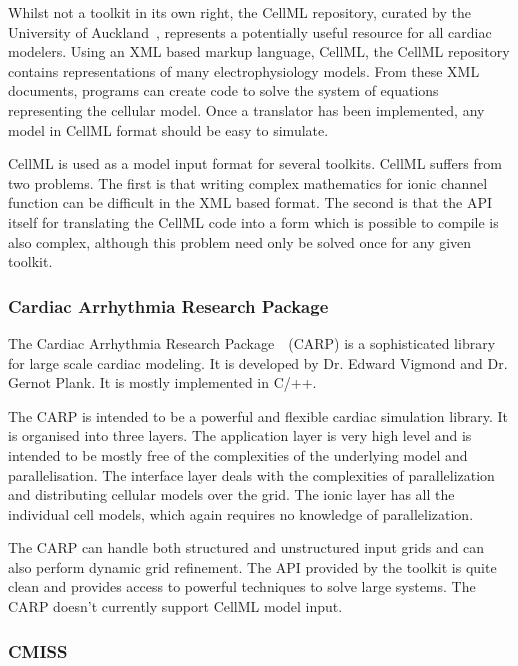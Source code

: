 Whilst not a toolkit in its own right, the CellML repository, curated by the
University of Auckland~\cite{Lloyd2008}, represents a potentially useful
resource for all cardiac modelers.
Using an XML based markup language, CellML, the CellML repository contains
representations of many electrophysiology models.
From these XML documents, programs can create code to solve the system of
equations representing the cellular model.
Once a translator has been implemented, any model in CellML format should be
easy to simulate.

CellML is used as a model input format for several toolkits.
CellML suffers from two problems.
The first is that writing complex mathematics for ionic channel function can be
difficult in the XML based format.
The second is that the API itself for translating the CellML code into a form
which is possible to compile is also complex, although this problem need only be
solved once for any given toolkit.


\subsubsection{Cardiac Arrhythmia Research Package}

The Cardiac Arrhythmia Research Package~\cite{Vigmond2003,Bauer2007,Plank2005,Vigmond2007}\
(CARP) is a sophisticated library for large scale cardiac modeling.
It is developed by Dr. Edward Vigmond and Dr. Gernot Plank.
It is mostly implemented in C/++.

The CARP is intended to be a powerful and flexible cardiac simulation library.
It is organised into three layers.
The application layer is very high level and is intended to be mostly free of
the complexities of the underlying model and parallelisation.
The interface layer deals with the complexities of parallelization and
distributing cellular models over the grid.
The ionic layer has all the individual cell models, which again requires no
knowledge of parallelization.

The CARP can handle both structured and unstructured input grids and can also
perform dynamic grid refinement.
The API provided by the toolkit is quite clean and provides access to powerful
techniques to solve large systems.
The CARP doesn't currently support CellML model input.


\subsubsection{CMISS}

